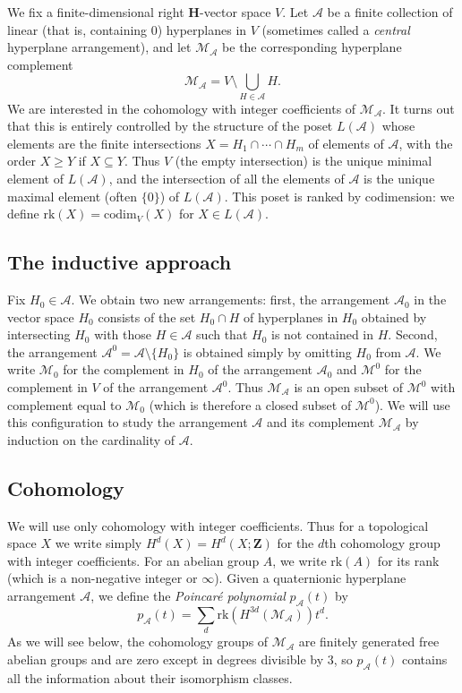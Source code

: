 \documentclass[11pt, reqno]{amsart}
\numberwithin{equation}{section}
\theoremstyle{definition}
\theoremstyle{plain}
\newcommand{\HH}{\mathbf{H}}
\newcommand{\ZZ}{\mathbf{Z}}
\newcommand{\A}{\mathcal{A}}
\newcommand{\cM}{\mathcal{M}}
\begin{document}
We fix a finite-dimensional right $\HH$-vector space $V$. Let $\A$ be a finite collection of linear (that is, containing $0$) hyperplanes in $V$ (sometimes called a \emph{central} hyperplane arrangement), and let $\cM_\A$ be the corresponding hyperplane complement $$\cM_\A=V \setminus \bigcup_{H \in \A} H.$$ We are interested in the cohomology with integer coefficients of $\cM_\A$. It turns out that this is entirely controlled by the structure of the poset $L(\A)$ whose elements are the finite intersections $X=H_1 \cap \cdots \cap H_m$ of elements of $\A$, with the order $X \geq Y$ if $X \subseteq Y$. Thus $V$ (the empty intersection) is the unique minimal element of $L(\A)$, and the intersection of all the elements of $\A$ is the unique maximal element (often $\{ 0\}$) of $L(\A)$. This poset is ranked by codimension: we define $\mathrm{rk}(X)=\mathrm{codim}_V(X)$ for $X \in L(\A)$. 

\subsection{The inductive approach} Fix $H_0 \in \A$. We obtain two new arrangements: first, the arrangement $\A_0$ in the vector space $H_0$ consists of the set $H_0 \cap H$ of hyperplanes in $H_0$ obtained by intersecting $H_0$ with those $H \in \A$ such that $H_0$ is not contained in $H$. Second, the arrangement $\A^0=\A \setminus \{H_0 \}$ is obtained simply by omitting $H_0$ from $\A$. We write $\cM_0$ for the complement in $H_0$ of the arrangement $\A_0$ and $\cM^0$ for the complement in $V$ of the arrangement $\A^0$. Thus $\cM_\A$ is an open subset of $\cM^0$ with complement equal to $\cM_0$ (which is therefore a closed subset of $\cM^0$). We will use this configuration to study the arrangement $\A$ and its complement $\cM_\A$ by induction on the cardinality of $\A$.

\subsection{Cohomology} We will use only cohomology with integer coefficients. Thus for a topological space $X$ we write simply $H^d(X)=H^d(X;\ZZ)$ for the $d$th cohomology group with integer coefficients. For an abelian group $A$, we write $\mathrm{rk}(A)$ for its rank (which is a non-negative integer or $\infty$). Given a quaternionic hyperplane arrangement $\A$, we define the \emph{Poincar\'e polynomial} $p_\A(t)$ by
$$p_\A(t)=\sum_d \mathrm{rk}(H^{3d}(\cM_\A))t^d.$$ As we will see below, the cohomology groups of $\cM_\A$ are finitely generated free abelian groups and are zero except in degrees divisible by $3$, so $p_\A(t)$ contains all the information about their isomorphism classes.
\end{document}
